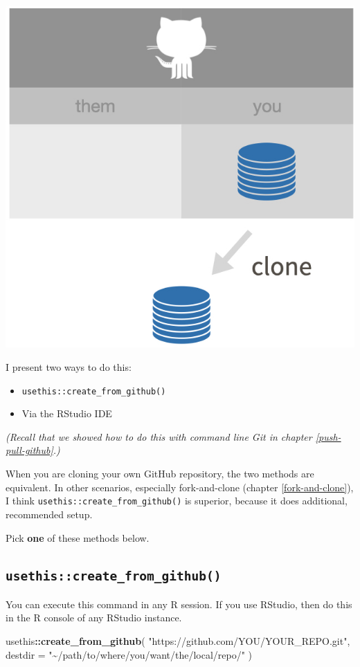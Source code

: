 \documentclass[
]{book}
\newenvironment{Shaded}{\begin{snugshade}}{\end{snugshade}}
\newcommand{\AttributeTok}[1]{\textcolor[rgb]{0.13,0.29,0.53}{#1}}
\newcommand{\FunctionTok}[1]{\textcolor[rgb]{0.13,0.29,0.53}{\textbf{#1}}}
\newcommand{\NormalTok}[1]{#1}
\newcommand{\SpecialCharTok}[1]{\textcolor[rgb]{0.81,0.36,0.00}{\textbf{#1}}}
\newcommand{\StringTok}[1]{\textcolor[rgb]{0.31,0.60,0.02}{#1}}
\providecommand{\tightlist}{%
  \setlength{\itemsep}{0pt}\setlength{\parskip}{0pt}}
\begin{document}
\begin{center}\includegraphics[width=0.6\linewidth]{img/new-project-github-first} \end{center}

I present two ways to do this:

\begin{itemize}
\tightlist
\item
  \texttt{usethis::create\_from\_github()}
\item
  Via the RStudio IDE
\end{itemize}

\emph{(Recall that we showed how to do this with command line Git in chapter \ref{push-pull-github}.)}

When you are cloning your own GitHub repository, the two methods are equivalent.
In other scenarios, especially fork-and-clone (chapter \ref{fork-and-clone}), I think \texttt{usethis::create\_from\_github()} is superior, because it does additional, recommended setup.

Pick \textbf{one} of these methods below.

\subsection{\texorpdfstring{\texttt{usethis::create\_from\_github()}}{usethis::create\_from\_github()}}\label{usethiscreate_from_github}

You can execute this command in any R session.
If you use RStudio, then do this in the R console of any RStudio instance.

\begin{Shaded}
\begin{Highlighting}[]
\NormalTok{usethis}\SpecialCharTok{::}\FunctionTok{create\_from\_github}\NormalTok{(}
  \StringTok{"https://github.com/YOU/YOUR\_REPO.git"}\NormalTok{,}
  \AttributeTok{destdir =} \StringTok{"\textasciitilde{}/path/to/where/you/want/the/local/repo/"}
\NormalTok{)}
\end{Highlighting}
\end{Shaded}
\end{document}
